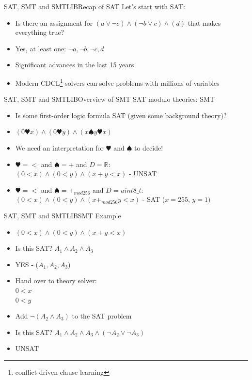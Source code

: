 \documentclass{beamer}
\begin{document}
\begin{frame}{SAT, SMT and SMTLIB}{Recap of SAT}
  Let's start with SAT:
  \begin{itemize}
  \item Is there an assignment for $(a \lor \lnot c) \land (\lnot b
    \lor c) \land (d)$ that makes everything true?
    \pause
  \item Yes, at least one: $\lnot a, \lnot b, \lnot c, d$
  \item Significant advances in the last 15 years
  \item Modern CDCL\footnote{conflict-driven clause learning} solvers
    can solve  problems with millions of variables
  \end{itemize}
\end{frame}

\begin{frame}{SAT, SMT and SMTLIB}{Overview of SMT}
  SAT modulo theories: SMT
  \begin{itemize}
  \item Is some first-order logic formula SAT (given some background
    theory)?
    \pause
  \item $(0 \varheart x) \land (0 \varheart y) \land
    (x \spadesuit y \varheart x)$ \pause
  \item We need an interpretation for $\varheart$ and $\spadesuit$ to
    decide!
    \pause
  \item $\varheart = <$ and $\spadesuit = +$ and
    $D = \mathbb{R}$:\\
    $(0 < x) \land (0 < y) \land (x + y < x)$
    \pause - {\color{AnSecondary01} UNSAT}
    \pause
  \item $\varheart = <$ and $\spadesuit = +_{mod 256}$ and
    $D = uint8\_t$:\\
    $(0 < x) \land (0 < y) \land (x +_{mod 256} y < x)$
    \pause - {\color{AnSecondary01} SAT ($x = 255$, $y = 1)$}
  \end{itemize}
\end{frame}

\begin{frame}{SAT, SMT and SMTLIB}{SMT Example}
  \begin{itemize}
  \item<1-> $(0 < x) \land (0 < y) \land (x + y < x)$
  \item<2-> Is this SAT? $A_1 \land A_2 \land A_3$
  \item<3-> YES - ($A_1, A_2, A_3$)
  \item<4-> Hand over to theory solver:\\
    $0 < x$\\
    $0 < y$\\
  \item<8-> Add $\lnot (A_2 \land A_3)$ to the SAT problem
  \item<9-> Is this SAT? $A_1 \land A_2 \land A_3 \land (\lnot A_2 \lor
    \lnot A_3)$
  \item<10-> UNSAT
  \end{itemize}
\end{frame}
\end{document}
